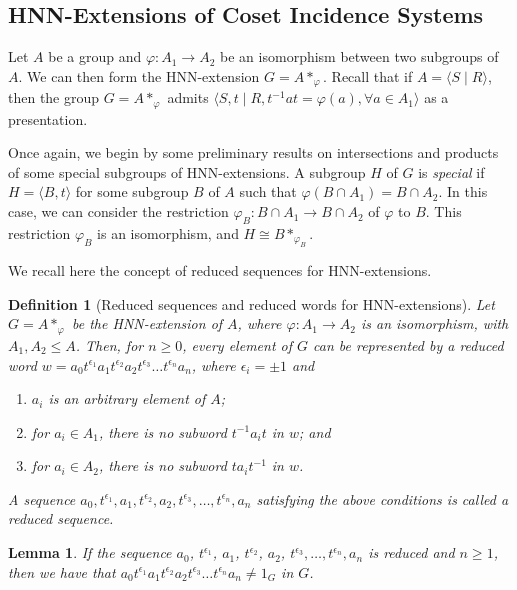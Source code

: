 \documentclass[11pt,letterpaper]{amsart}
\newtheorem{lemma}[prop]{Lemma}
\newtheorem{definition}[prop]{Definition}
\begin{document}
\subsection{HNN-Extensions of Coset Incidence Systems}

Let $A$ be a group and $\varphi \colon A_1 \to A_2$ be an isomorphism between two subgroups of $A$. We can then form the HNN-extension $G = A *_\varphi$. Recall that if $A = \langle S \mid R \rangle$, then the group $G = A *_\varphi$ admits $\langle S,t \mid R, t^{-1}at = \varphi(a), \forall a \in A_1 \rangle$ as a presentation. 

Once again, we begin by some preliminary results on intersections and products of some special subgroups of HNN-extensions.
A subgroup $H$ of $G$ is \textit{special} if $H = \langle B, t \rangle$ for some subgroup $B$ of $A$ such that $\varphi(B\cap A_1)=B\cap A_2$. In this case, we can consider the restriction $\varphi_B \colon B \cap A_1 \to B \cap A_2$ of $\varphi$ to $B$. This restriction $\varphi_B$ is an isomorphism, and $H \cong B *_{\varphi_B}$.

We recall here the concept of reduced sequences for HNN-extensions.

\begin{definition}[Reduced sequences and reduced words for HNN-extensions]

    Let $G=A*_\varphi$ be the HNN-extension of $A$, where $\varphi: A_1\to A_2$ is an isomorphism, with $A_1,A_2\leq A$.
    Then, for $n\geq 0$, every element of $G$ can be represented by a \textit{reduced word}  $w=a_0t^{\epsilon_1}a_1t^{\epsilon_2}a_2 t^{\epsilon_3}\ldots t^{\epsilon_n}a_n$, where $\epsilon_i=\pm 1$ and
    \begin{enumerate}
        \item $a_i$ is an arbitrary element of $A$;
        \item for $a_i\in A_1$, there is no subword $t^{-1}a_it$ in $w$; and
        \item for $a_i \in A_2$, there is no subword $t a_it^{-1}$ in $w$.
    \end{enumerate}
    A sequence $a_0, t^{\epsilon_1},a_1,t^{\epsilon_2},a_2, t^{\epsilon_3},\ldots, t^{\epsilon_n},a_n$ satisfying the above conditions is called a \textit{reduced sequence}.
\end{definition}

\begin{lemma}\cite[Britton's Lemma -- Chapter IV]{Lyndon2001}\label{lem:BrittonLemma}
    If the sequence $a_0$, $t^{\epsilon_1}$, $a_1$, $t^{\epsilon_2}$, $a_2$, $t^{\epsilon_3},\ldots, t^{\epsilon_n},a_n$ is reduced and $n\geq 1$, then we have that $a_0t^{\epsilon_1}$$a_1t^{\epsilon_2}a_2 t^{\epsilon_3}$$\ldots t^{\epsilon_n}$$a_n\neq 1_G$ in $G$.
\end{lemma}
\end{document}
